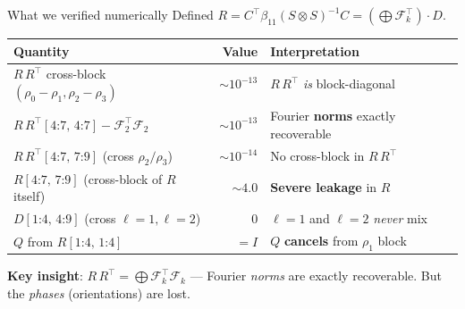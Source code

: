 \documentclass[aspectratio=169]{beamer}
\begin{document}
\begin{frame}{What we verified numerically}
  Defined $R = C^\top \beta_{11} (S \otimes S)^{-1} C = (\bigoplus \mathcal{F}_k^\top) \cdot D$.

  \bigskip

  \begin{tabular}{lrl}
    \toprule
    \textbf{Quantity} & \textbf{Value} & \textbf{Interpretation} \\
    \midrule
    $R\,R^\top$ cross-block $(\rho_0{-}\rho_1, \rho_2{-}\rho_3)$ & $\sim 10^{-13}$ & $R\,R^\top$ \emph{is} block-diagonal \\
    $R\,R^\top[\text{4:7, 4:7}] - \mathcal{F}_2^\top\mathcal{F}_2$ & $\sim 10^{-13}$ & Fourier \textbf{norms} exactly recoverable \\
    $R\,R^\top[\text{4:7, 7:9}]$ (cross $\rho_2/\rho_3$) & $\sim 10^{-14}$ & No cross-block in $R\,R^\top$ \\
    $R[\text{4:7, 7:9}]$ (cross-block of $R$ itself) & $\sim 4.0$ & \textbf{Severe leakage} in $R$ \\
    $D[\text{1:4, 4:9}]$ (cross $\ell{=}1, \ell{=}2$) & $0$ & $\ell{=}1$ and $\ell{=}2$ \emph{never} mix \\
    $Q$ from $R[\text{1:4, 1:4}]$ & $= I$ & $Q$ \textbf{cancels} from $\rho_1$ block \\
    \bottomrule
  \end{tabular}

  \bigskip

  \textbf{Key insight}: $R\,R^\top = \bigoplus \mathcal{F}_k^\top \mathcal{F}_k$ --- Fourier \emph{norms}
  are exactly recoverable. But the \emph{phases} (orientations) are lost.
\end{frame}
\end{document}
